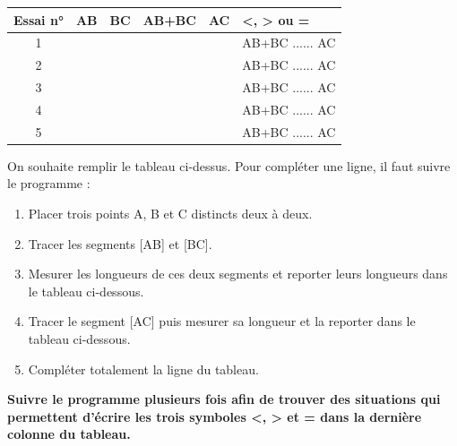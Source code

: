 \documentclass[a4paper]{book}
\begin{document}
\vspace{2cm}



    \begin{exercice}
        \begin{tabular}{|c|l|l|l|l|l|}
            \hline
            Essai n° & AB & BC & AB+BC & AC & \textless , \; \textgreater \; ou \; = \\ \hline
            1        &    &    &       &    & AB+BC ...... AC                  \\ \hline
            2        &    &    &       &    & AB+BC ...... AC                  \\ \hline
            3        &    &    &       &    & AB+BC ...... AC                  \\ \hline
            4        &    &    &       &    & AB+BC ...... AC                  \\ \hline
            5        &    &    &       &    & AB+BC ...... AC                  \\ \hline
        \end{tabular}

        \medskip
        
        On souhaite remplir le tableau ci-dessus. Pour compléter une ligne, il faut suivre le programme :
        \begin{enumerate}
            \item[a.] Placer trois points A, B et C distincts deux à deux.

            \item[b.] Tracer les segments [AB] et [BC].

            \item[c.] Mesurer les longueurs de ces deux segments et reporter leurs longueurs dans le tableau ci-dessous.

            \item[d.] Tracer le segment [AC] puis mesurer sa longueur et la reporter dans le tableau ci-dessous.

            \item[e.] Compléter totalement la ligne du tableau.
        \end{enumerate}

        \medskip

        \textbf{Suivre le programme plusieurs fois afin de trouver des situations qui permettent d'écrire les trois symboles <, > et = dans la dernière colonne du tableau.}
    \end{exercice}
\end{document}
